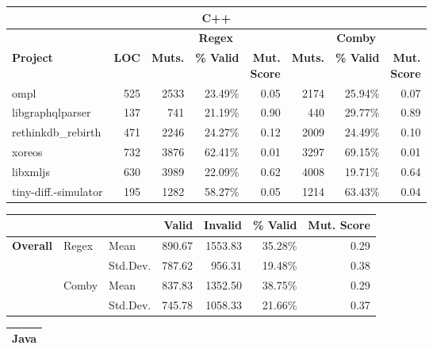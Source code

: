 \documentclass[acmsmall,screen,review,anonymous]{acmart}
\newcommand{\mc}[3]{\multicolumn{#1}{#2}{#3}}
\begin{document}
{\begin{table}[hbtp]
\begin{varwidth}{.8\linewidth}
\begin{tabularx}{\linewidth}{X|r|rrr|rrr}
\bottomrule\toprule
\mc{8}{c}{\textbf{C++}} \\\midrule
                 &              & \multicolumn{3}{c|}{\textbf{Regex}} &\multicolumn{3}{c}{\textbf{Comby}}  \\
\textbf{Project} & \textbf{LOC} & \textbf{Muts.} & \textbf{\% Valid} & \makecell{\textbf{Mut.} \\ \textbf{Score}} &  \textbf{Muts.} &  \textbf{\% Valid} & \makecell{\textbf{Mut.} \\ \textbf{Score}} \\\midrule
ompl & 525 & 2533 & 23.49\% & 0.05 & 2174  & 25.94\% & 0.07  \\
{libgraphqlparser} & 137 & 741 & 21.19\% & 0.90 & 440 & 29.77\% & 0.89\\
{rethinkdb\_rebirth} &471 & 2246 & 24.27\% & 0.12 & 2009 & 24.49\% & 0.10\\
xoreos & 732  & 3876  & 62.41\% & 0.01 & 3297 & 69.15\% & 0.01\\
libxmljs &630 &  3989 & 22.09\% & 0.62 & 4008 & 19.71\% &
0.64 \\[0.5ex]
tiny-diff.-simulator &  195 & 1282 &58.27\% & 0.05 & 1214 & 63.43\% & 0.04\\
\bottomrule
\end{tabularx}
\begin{tabularx}{\linewidth}{Xllrrrr}
                  & &       & \textbf{Valid}  & \textbf{Invalid}  & \textbf{\% Valid} & \textbf{Mut. Score} \\\midrule
 \multirow{4}{*}{\textbf{Overall}} & \multirow{2}{*}{Regex} & Mean     & 890.67 &  1553.83 & 35.28\% & 0.29\\
                          & & Std.Dev. & 787.62 & 956.31   & 19.48\%  & 0.38\\\cline{2-7}
  & \multirow{2}{*}{Comby}  & Mean     & 837.83 & 1352.50 & 38.75\%  & 0.29\\
                         & & Std.Dev. & 745.78 & 1058.33 & 21.66\% & 0.37 \\\bottomrule
 \end{tabularx}
\begin{tabularx}{\linewidth}{X|r|crr|crr}
\toprule
\mc{8}{c}{\textbf{Java}} \\\midrule

\end{tabularx}
\end{varwidth}
\end{table}}
\end{document}
